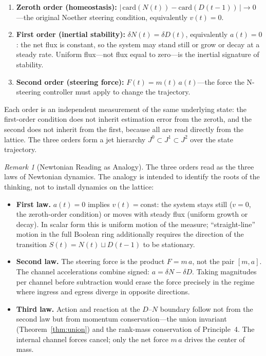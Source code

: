 \documentclass[11pt,a4paper]{article}
\theoremstyle{remark}
\newtheorem{remark}{Remark}[section]
\begin{document}
\begin{enumerate}[leftmargin=*,nosep]
  \item \textbf{Zeroth order (homeostasis):}
    $|\,\text{card}(N(t)) - \text{card}(D(t-1))\,| \to 0$---the original
    Noether steering condition, equivalently $v(t) = 0$.
  \item \textbf{First order (inertial stability):} $\delta N(t) = \delta D(t)$,
    equivalently $a(t) = 0$: the net flux is constant, so the system may stand
    still or grow or decay at a steady rate. Uniform flux---not flux equal to
    zero---is the inertial signature of stability.
  \item \textbf{Second order (steering force):} $F(t) = m(t)\, a(t)$---the
    force the N-steering controller must apply to change the trajectory.
\end{enumerate}

Each order is an independent measurement of the same underlying state: the
first-order condition does not inherit estimation error from the zeroth, and
the second does not inherit from the first, because all are read directly from
the lattice. The three orders form a jet hierarchy $J^0 \subset J^1 \subset
J^2$ over the state trajectory.

\begin{remark}[Newtonian Reading as Analogy]
The three orders read as the three laws of Newtonian dynamics. The analogy is
intended to identify the roots of the thinking, not to install dynamics on the
lattice:

\begin{itemize}[leftmargin=*,nosep]
  \item \textbf{First law.} $a(t) = 0$ implies $v(t) = \text{const}$: the
    system stays still ($v = 0$, the zeroth-order condition) or moves with
    steady flux (uniform growth or decay). In scalar form this is uniform
    motion of the measure; ``straight-line'' motion in the full Boolean ring
    additionally requires the direction of the transition
    $S(t) = N(t) \sqcup D(t-1)$ to be stationary.
  \item \textbf{Second law.} The steering force is the product $F = m\,a$,
    not the pair $[m, a]$. The channel accelerations combine signed:
    $a = \delta N - \delta D$. Taking magnitudes per channel before
    subtraction would erase the force precisely in the regime where ingress
    and egress diverge in opposite directions.
  \item \textbf{Third law.} Action and reaction at the $D$--$N$ boundary follow
    not from the second law but from momentum conservation---the union
    invariant (Theorem~\ref{thm:union}) and the rank-mass conservation of
    Principle~4. The internal channel forces cancel; only the net force
    $m\,a$ drives the center of mass.
\end{itemize}
\end{remark}
\end{document}
